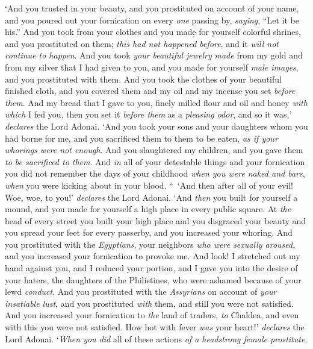 \begin{biblechapter}
\verse ‘And you trusted in your beauty, and you prostituted on account of your name, and you poured out your fornication on every \textit{one} passing by, \textit{saying}, “Let it be his.”
\verse And you took from your clothes and you made for yourself colorful shrines, and you prostituted on them; \textit{this had not happened before}, and it \textit{will not continue to happen}.
\verse And you took \textit{your beautiful jewelry} \textit{made} from my gold and from my silver that I had given to you, and you made for yourself \textit{male images}, and you prostituted with them.
\verse And you took the clothes of your beautiful finished cloth, and you covered them and my oil and my incense you set \textit{before them}.
\verse And my bread that I gave to you, finely milled flour and oil and honey \textit{with which} I fed you, then you set it \textit{before them} as a \textit{pleasing odor}, and so it was,’ \textit{declares} the Lord Adonai.
\verse ‘And you took your sons and your daughters whom you had borne for me, and you sacrificed them to them to be eaten, \textit{as if your whorings were not enough}.
\verse And you slaughtered my children, and you gave them \textit{to be sacrificed to them}.
\verse And \textit{in} all of your detestable things and your fornication you did not remember the days of your childhood \textit{when you were naked and bare}, \textit{when} you were kicking about in your blood.
\verse “ ‘And then after all of your evil! Woe, woe, to you!’ \textit{declares} the Lord Adonai.
\verse ‘And \textit{then} you built for yourself a mound, and you made for yourself a high place in every public square.
\verse At \textit{the} head of every street you built your high place and you disgraced your beauty and you spread your feet for every passerby, and you increased your whoring.
\verse And you prostituted with the \textit{Egyptians}, your neighbors \textit{who were sexually aroused}, and you increased your fornication to provoke me.
\verse And look! I stretched out my hand against you, and I reduced your portion, and I gave you into the desire of your haters, the daughters of the Philistines, who were ashamed because of your lewd \textit{conduct}.
\verse And you prostituted with the \textit{Assyrians} on account of \textit{your insatiable lust}, and you prostituted \textit{with} them, and still you were not satisfied.
\verse And you increased your fornication to \textit{the} land of traders, \textit{to} Chaldea, and even with this you were not satisfied.
\verse How hot with fever \textit{was} your heart!’ \textit{declares} the Lord Adonai. ‘\textit{When you did} all of these actions \textit{of a headstrong female prostitute},

\end{biblechapter}
